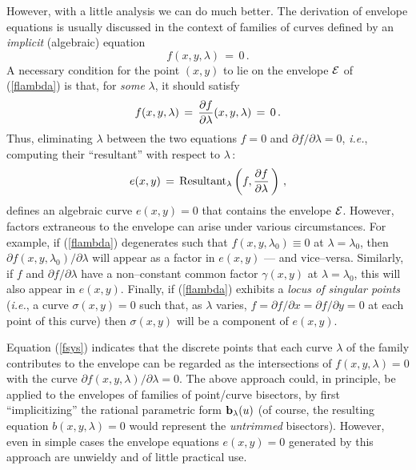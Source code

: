 {However, with a little analysis we can do much better. The derivation
of envelope equations is usually discussed \cite{boltyanskii64,fowler29}
in the context of families of curves defined by an {\it implicit\/}
(algebraic) equation
\begin{equation} \label{flambda}
f(x,y,\lambda) \,=\, 0 \,.
\end{equation}
A necessary condition for the point $(x,y)$ to lie on the envelope
${\cal E}$ of (\ref{flambda}) is that, for {\it some\/} $\lambda$, it
should satisfy
\begin{equation} \label{fsys}
f(x,y,\lambda) \,=\,
{\partial f \over \partial\lambda}(x,y,\lambda) \,=\, 0 \,.
\end{equation}
Thus, eliminating $\lambda$ between the two equations $f=0$
and $\partial f/\partial\lambda=0$, {\it i.e.}, computing their
``resultant'' \cite{uspensky48} with respect to $\lambda\,$:
\begin{equation} \label{e}
e(x,y) \,=\, {\rm Resultant}_\lambda
\left(f,{\partial f \over \partial\lambda}\,\right) \,,
\end{equation}
defines an algebraic curve $e(x,y)=0$ that contains the envelope
${\cal E}$. However, factors extraneous to the envelope can arise
under various circumstances. For example, if (\ref{flambda})
degenerates such that $f(x,y,\lambda_0) \equiv 0$ at $\lambda
=\lambda_0$, then $\partial f(x,y,\lambda_0)/\partial\lambda$
will appear as a factor in $e(x,y)$ --- and vice--versa. Similarly,
if $f$ and $\partial f/\partial\lambda$ have a non--constant common
factor $\gamma(x,y)$ at $\lambda=\lambda_0$, this will also appear
in $e(x,y)$. Finally, if (\ref{flambda}) exhibits a {\it locus of
singular points\/} ({\it i.e.}, a curve $\sigma(x,y)=0$ such that,
as $\lambda$ varies, $f=\partial f/\partial x=\partial f/\partial
y=0$ at each point of this curve) then $\sigma(x,y)$ will be a
component of $e(x,y)$.

Equation (\ref{fsys}) indicates that the discrete points that
each curve $\lambda$ of the family contributes to the envelope
can be regarded as the intersections of $f(x,y,\lambda)=0$ with
the curve $\partial f(x,y,\lambda)/\partial\lambda=0$. The above
approach could, in principle, be applied to the envelopes of
families of point/curve bisectors, by first ``implicitizing''
\cite{sederberg84} the rational parametric form ${\bf b}_\lambda
(u)$ (of course, the resulting equation $b(x,y,\lambda)=0$ would
represent the {\it untrimmed\/} bisectors). However, even in simple
cases the envelope equations $e(x,y)=0$ generated by this approach
are unwieldy and of little practical use.

}

